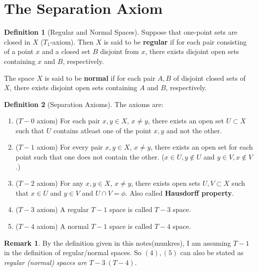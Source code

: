 \documentclass[12pt,reqno]{amsart}
\theoremstyle{plain}
\theoremstyle{definition}
\newtheorem{defn}{Definition}
\newtheorem{rem}{Remark}
\begin{document}
\section{The Separation Axiom}
\begin{defn}[Regular and Normal Spaces]
    Suppose that one-point sets are closed in $X$ ($T_1$-axiom). Then $X$ is said to be {\bf regular} if for each pair consisting of a point $x$ and a closed set $B$ disjoint from $x$, there exists disjoint open sets containing $x$ and $B$, respectively.

    The space $X$ is said to be {\bf normal} if for each pair $A,B$ of disjoint closed sets of $X$, there exists disjoint open sets containing $A$ and $B$, respectively.
\end{defn}
\begin{defn}[Separation Axioms]
    The axioms are:
    \begin{enumerate}
        \item ($T-0$ axiom) For each pair $x,y \in X$, $x \neq y$, there exists an open set $U \subset X$ such that $U$ contains atleast one of the point $x,y$ and not the other.
        \item ($T-1$ axiom) For every pair $x,y \in X$, $x \neq y$, there exists an open set for each point such that one does not contain the other. ($x \in U, y \notin U$ and $ y\in V, x \notin V$.)
        \item ($T-2$ axiom) For any $x,y \in X$, $x \neq y$, there exists open sets $U,V \subset X$ such that $x \in U$ and $y \in V$ and $U \cap V = \phi$. Also called {\bf Hausdorff property}.
        \item  ($T-3$ axiom) A regular $T-1$ space is called $T-3$ space.
        \item ($T-4$ axiom) A normal $T-1$ space is called $T-4$ space.
    \end{enumerate}
\end{defn}
\begin{rem}
    By the definition given in this notes(munkres), I am assuming $T-1$ in the definition of regular/normal spaces. So $(4),(5)$ can also be stated as {\it regular (normal) spaces are $T-3~(T-4)$}.
\end{rem}
\end{document}
